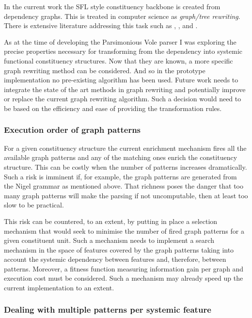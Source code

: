    In the current work the SFL style constituency backbone is created from dependency graphs. This is treated in computer science as \textit{graph/tree rewriting}. There is extensive literature addressing this task such as \citet{barendregt1987term}, \citet{courcelle1990graph}, \citet{plasmeijer1993functional} and \citet{grzegorz1999handbook}. 
    
    As at the time of developing the Parsimonious Vole parser I was exploring the precise properties necessary for transforming from the dependency into systemic functional constituency structures. Now that they are known, a more specific graph rewriting method can be considered. And so in the prototype implementation no pre-existing algorithm has been used. Future work needs to integrate the state of the art methods in graph rewriting and potentially improve or replace the current graph rewriting algorithm. Such a decision would need to be based on the efficiency and ease of providing the transformation rules.

\subsubsection{Execution order of graph patterns}  
    
    For a given constituency structure the current enrichment mechanism fires all the available graph patterns and any of the matching ones enrich the constituency structure. This can be costly when the number of patterns increases dramatically. Such a risk is imminent if, for example, the graph patterns are generated from the Nigel grammar as mentioned above. That richness poses the danger that too many graph patterns will make the parsing if not uncomputable, then at least too slow to be practical. 
    
    This risk can be countered, to an extent, by putting in place a selection mechanism that would seek to minimise the number of fired graph patterns for a given constituent unit. Such a mechanism needs to implement a search mechanism in the space of features covered by the graph patterns taking into account the systemic dependency between features and, therefore, between patterns. Moreover, a fitness function measuring information gain per graph and execution cost must be considered. Such a mechanism may already speed up the current implementation to an extent. 
    
\subsubsection{Dealing with multiple patterns per systemic feature}    


